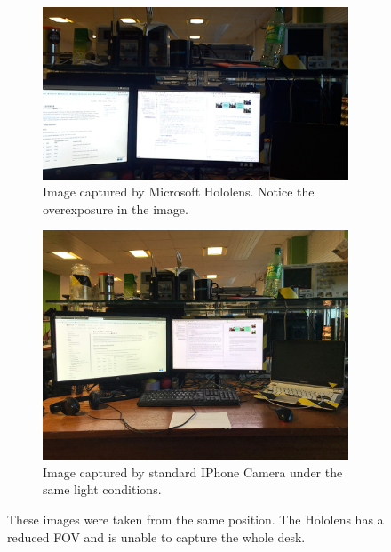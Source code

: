 \begin{figure}[ht]
	\begin{subfigure}[b]{.45\textwidth}
		\centering
		\includegraphics[width=1.0\linewidth]{img/chapter5_implementation/hololensFOV.jpeg}
		\caption{Image captured by Microsoft Hololens. Notice the overexposure in the image.}
	\end{subfigure}%
	\hspace{\fill} 
	\begin{subfigure}[b]{.45\textwidth}
		\centering
		\includegraphics[width=0.75\linewidth]{img/chapter5_implementation/hololensFOVIphone.jpg}
		\caption{Image captured by standard IPhone Camera under the same light conditions.}
	\end{subfigure}
	\vspace{-1\baselineskip}
	\begin{center}
		\caption{These images were taken from the same position. The Hololens has a reduced FOV and is unable to capture the whole desk.}
		\label{fig:holoVsIphone}
	\end{center}
	\vspace{-2\baselineskip}
\end{figure}

